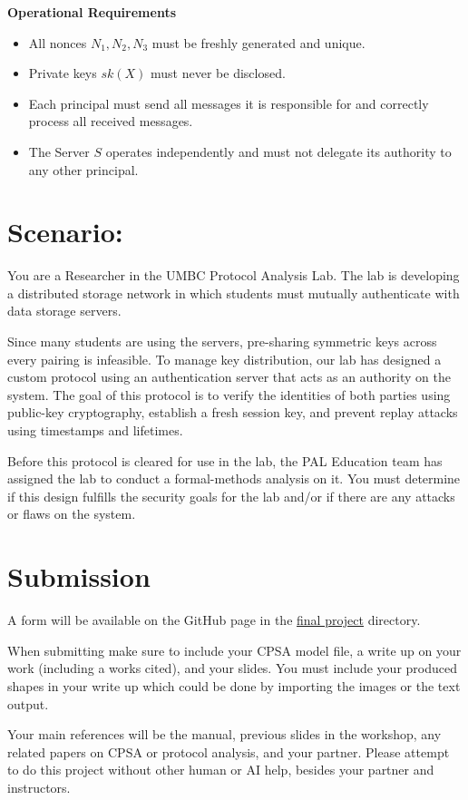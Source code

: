 \documentclass[12pt]{article}
\begin{document}
\vspace{0.5em}
\noindent
\textbf{Operational Requirements}

\begin{itemize}[nosep]
    \item All nonces $N_1, N_2, N_3$ must be freshly generated and unique.
    \item Private keys $sk(X)$ must never be disclosed.
    \item Each principal must send all messages it is responsible for and correctly process all received messages.
    \item The Server $S$ operates independently and must not delegate its authority to any other principal.
\end{itemize}

\pagebreak

\section{Scenario:}

You are a Researcher in the UMBC Protocol Analysis Lab. 
The lab is developing a distributed storage network in which students must mutually authenticate with data storage servers. 

Since many students are using the servers, pre-sharing symmetric keys across every pairing is infeasible. 
To manage key distribution, our lab has designed a custom protocol using an authentication server that acts as an authority on the system. 
The goal of this protocol is to verify the identities of both parties using public-key cryptography, establish a fresh session key, and prevent replay attacks using timestamps and lifetimes.

Before this protocol is cleared for use in the lab, the PAL Education team has assigned the lab to conduct a formal-methods analysis on it.
You must determine if this design fulfills the security goals for the lab and/or if there are any attacks or flaws on the system.

\section{Submission}
A form will be available on the GitHub page in the \href{https://github.com/UMBC-Protocol-Analysis-Lab/CPSA-Summer-Session/tree/main/final_project}{final project} directory.

When submitting make sure to include your CPSA model file, a write up on your work (including a works cited), and your slides.
You must include your produced shapes in your write up which could be done by importing the images or the text output.

Your main references will be the manual, previous slides in the workshop, any related papers on CPSA or protocol analysis, and your partner.
Please attempt to do this project without other human or AI help, besides your partner and instructors.
\end{document}
